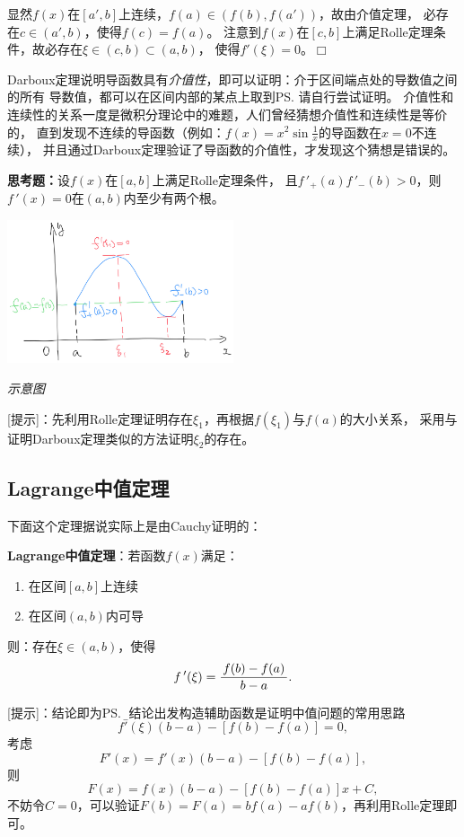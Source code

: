显然$f(x)$在$[a',b]$上连续，$f(a)\in(f(b),f(a'))$，故由介值定理，
必存在$c\in(a',b)$，使得$f(c)=f(a)$。
注意到$f(x)$在$[c,b]$上满足Rolle定理条件，故必存在$\xi\in(c,b)\subset(a,b)$，
使得$f'(\xi)=0$。\hfill$\Box$

Darboux定理说明导函数具有{\it 介值性}，即可以证明：介于区间端点处的导数值之间的所有
导数值，都可以在区间内部的某点上取到\ps{请自行尝试证明}。
介值性和连续性的关系一度是微积分理论中的难题，人们曾经猜想介值性和连续性是等价的，
直到发现不连续的导函数（例如：$f(x)=x^2\sin\frac1x$的导函数在$x=0$不连续），
并且通过Darboux定理验证了导函数的介值性，才发现这个猜想是错误的。

{\bf 思考题：}设$f(x)$在$[a,b]$上满足Rolle定理条件，
且$f\,'_+(a)f\,'_-(b)>0$，则$f\,'(x)=0$在$(a,b)$内至少有两个根。

\begin{center}
	\includegraphics[width=0.5\textwidth]{./images/ch3/Darboux2.jpg}
	
	\it 示意图
\end{center}
[提示]：先利用Rolle定理证明存在$\xi_1$，再根据$f(\xi_1)$与$f(a)$的大小关系，
采用与证明Darboux定理类似的方法证明$\xi_2$的存在。

\subsection{Lagrange中值定理}

下面这个定理据说实际上是由Cauchy证明的：

\begin{thx}
	{\bf Lagrange中值定理}：若函数$f(x)$满足：
	\begin{enumerate}[(1)]
	  \setlength{\itemindent}{1cm}
	  \item 在区间$[a,b]$上连续 
	  \item 在区间$(a,b)$内可导 
	\end{enumerate}
	则：存在$\xi\in(a,b)$，使得 
	$$f\,'(\xi)=\displaystyle\frac{\,{f(b)-f(a)}\,}{\,{b-a}\,}.$$
\end{thx}

[提示]：结论即为\ps{\b 从结论出发构造辅助函数是证明中值问题的常用思路}
$$f'(\xi)(b-a)-[f(b)-f(a)]=0,$$
考虑
$$F'(x)=f'(x)(b-a)-[f(b)-f(a)],$$
则
$$F(x)=f(x)(b-a)-[f(b)-f(a)]x+C,$$
不妨令$C=0$，可以验证$F(b)=F(a)=bf(a)-af(b)$，再利用Rolle定理即可。

